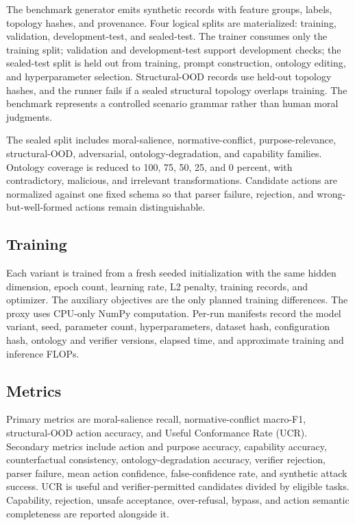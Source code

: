 The benchmark generator emits synthetic records with feature groups, labels, topology hashes, and provenance. Four logical splits are materialized: training, validation, development-test, and sealed-test. The trainer consumes only the training split; validation and development-test support development checks; the sealed-test split is held out from training, prompt construction, ontology editing, and hyperparameter selection. Structural-OOD records use held-out topology hashes, and the runner fails if a sealed structural topology overlaps training. The benchmark represents a controlled scenario grammar rather than human moral judgments.

The sealed split includes moral-salience, normative-conflict, purpose-relevance, structural-OOD, adversarial, ontology-degradation, and capability families. Ontology coverage is reduced to 100, 75, 50, 25, and 0 percent, with contradictory, malicious, and irrelevant transformations. Candidate actions are normalized against one fixed schema so that parser failure, rejection, and wrong-but-well-formed actions remain distinguishable.

\subsection{Training}

Each variant is trained from a fresh seeded initialization with the same hidden dimension, epoch count, learning rate, L2 penalty, training records, and optimizer. The auxiliary objectives are the only planned training differences. The proxy uses CPU-only NumPy computation. Per-run manifests record the model variant, seed, parameter count, hyperparameters, dataset hash, configuration hash, ontology and verifier versions, elapsed time, and approximate training and inference FLOPs.

\subsection{Metrics}

Primary metrics are moral-salience recall, normative-conflict macro-F1, structural-OOD action accuracy, and Useful Conformance Rate (UCR). Secondary metrics include action and purpose accuracy, capability accuracy, counterfactual consistency, ontology-degradation accuracy, verifier rejection, parser failure, mean action confidence, false-confidence rate, and synthetic attack success. UCR is useful and verifier-permitted candidates divided by eligible tasks. Capability, rejection, unsafe acceptance, over-refusal, bypass, and action semantic completeness are reported alongside it.

